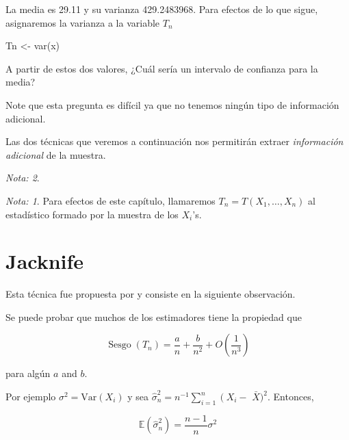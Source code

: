 \documentclass[
  12pt,
]{book}
\newenvironment{Shaded}{\begin{snugshade}}{\end{snugshade}}
\newcommand{\FunctionTok}[1]{\textcolor[rgb]{0.00,0.00,0.00}{#1}}
\newcommand{\NormalTok}[1]{#1}
\newcommand{\OtherTok}[1]{\textcolor[rgb]{0.56,0.35,0.01}{#1}}
\theoremstyle{definition}
\theoremstyle{definition}
\theoremstyle{definition}
\theoremstyle{remark}
\newtheorem*{remark}{Nota: }
\begin{document}
La media es 29.11 y su varianza 429.2483968. Para efectos de lo que sigue, asignaremos la varianza a la variable \(T_n\)

\begin{Shaded}
\begin{Highlighting}[]
\NormalTok{Tn }\OtherTok{\textless{}{-}} \FunctionTok{var}\NormalTok{(x)}
\end{Highlighting}
\end{Shaded}

A partir de estos dos valores, ¿Cuál sería un intervalo de confianza
para la media?

Note que esta pregunta es difícil ya que no tenemos ningún tipo de
información adicional.

Las dos técnicas que veremos a continuación nos permitirán extraer
\emph{información adicional} de la muestra.

\begin{remark}
\begin{remark}

{}Para efectos de este capítulo, llamaremos \(T_{n}=T\left(  X_{1},\ldots,X_{n}\right)\) al estadístico formado por la muestra de
los \(X_{i}\)'s.

\end{remark}
\end{remark}

\hypertarget{jacknife}{%
\section{Jacknife}\label{jacknife}}

Esta técnica fue propuesta por \cite{Quenouille1949} y consiste en la
siguiente observación.

Se puede probar que muchos de los estimadores tiene la propiedad que

\begin{equation}
\operatorname{Sesgo}\left(T_{n}\right)=\frac{a}{n}+\frac{b}{n^{2}}+O\left(\frac{1}{n^{3}}\right)
\end{equation}

para algún \(a\) and \(b\).

Por ejemplo \(\sigma^{2}=\mathrm{Var}\left(X_{i}\right)\) y sea
\(\widehat{\sigma}_{n}^{2}=n^{-1} \sum_{i=1}^{n}\left(X_{i}-\right.\)
\(\bar{X})^{2}\). Entonces,

\begin{equation*}
\mathbb{E}\left(\widehat{\sigma}_{n}^{2}\right)=
\frac{n-1}{n}\sigma^{2}
\end{equation*}
\end{document}
